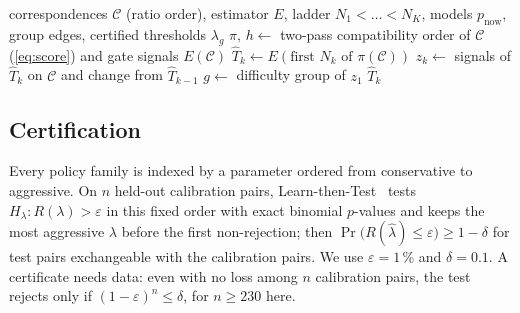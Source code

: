 \documentclass[10pt,twocolumn,letterpaper]{article}
\newcommand{\method}{CAB\xspace}
\begin{document}
\begin{algorithm}[h]
\caption{\method at test time}
\label{alg:cab}
\begin{algorithmic}[1]
\Require correspondences $\mathcal C$ (ratio order), estimator $E$, ladder $N_1<\dots<N_K$, models $p_\text{now}$, group edges, certified thresholds $\lambda_g$
\State $\pi,\,h\gets$ two-pass compatibility order of $\mathcal C$ (\cref{eq:score}) and gate signals
 \Return $E(\mathcal C)$  \EndIf
{}
  \State $\hat T_k\gets E(\text{first }N_k\text{ of }\pi(\mathcal C))$ 
  \State $z_k\gets$ signals of $\hat T_k$ on $\mathcal C$ and change from $\hat T_{k-1}$
   $g\gets$ difficulty group of $z_1$ \EndIf
   \Return $\hat T_k$ \EndIf
\EndFor
\end{algorithmic}
\end{algorithm}

\subsection{Certification}
\label{sec:certification}
Every policy family is indexed by a parameter ordered from conservative to aggressive.
On $n$ held-out calibration pairs, Learn-then-Test~\cite{angelopoulos2021ltt} tests $H_\lambda: R(\lambda)>\varepsilon$ in this fixed order with exact binomial $p$-values and keeps the most aggressive $\lambda$ before the first non-rejection; then $\Pr\big(R(\hat\lambda)\le\varepsilon\big)\ge 1-\delta$ for test pairs exchangeable with the calibration pairs.
We use $\varepsilon=1$\,\% and $\delta=0.1$.
A certificate needs data: even with no loss among $n$ calibration pairs, the test rejects only if $(1-\varepsilon)^n\le\delta$, \ie for $n\ge230$ here.
\end{document}
